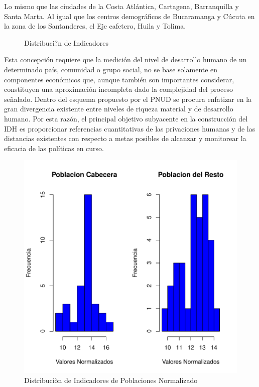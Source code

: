 Lo mismo que las ciudades de la Costa Atlántica, Cartagena, Barranquilla y Santa Marta. Al igual que los centros demográficos de Bucaramanga y Cúcuta en la zona de los Santanderes, el Eje cafetero, Huila y Tolima.

\begin{figure}[h]



\caption{Distribuci?n de Indicadores}
\label{hist}
\end{figure}

Esta concepción requiere que la medición del nivel de desarrollo humano de un determinado país, comunidad o grupo social, no se base solamente en componentes económicos que, aunque también son importantes considerar, constituyen una aproximación incompleta dado la complejidad del proceso señalado. Dentro del esquema propuesto por el PNUD se procura enfatizar en la gran divergencia existente entre niveles de riqueza material y de desarrollo humano. Por esta razón, el principal objetivo subyacente en la construcción del IDH es proporcionar referencias cuantitativas de las privaciones humanas y de las distancias existentes con respecto a metas posibles de alcanzar y monitorear la eficacia de las políticas en curso. 


\begin{figure}[h]
\includegraphics{univariada-hist1}
\caption{Distribuciòn de Indicadores de Poblaciones Normalizado}
\label{hist1}
\end{figure}


